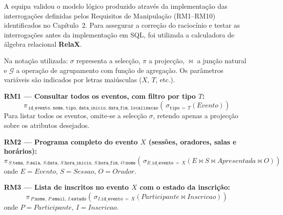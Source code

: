 \documentclass[runningheads]{llncs}
\begin{document}
                A equipa validou o modelo lógico produzido através da implementação das
                interrogações definidas pelos Requisitos de Manipulação (RM1--RM10) identificados
                no Capítulo~2. Para assegurar a correção do raciocínio e testar as interrogações
                antes da implementação em SQL, foi utilizada a calculadora de álgebra relacional
                \textbf{RelaX}.

                \vspace{0.3cm}
                Na notação utilizada: $\sigma$ representa a selecção, $\pi$ a projecção,
                $\bowtie$ a junção natural e $\mathcal{G}$ a operação de agrupamento com função
                de agregação. Os parâmetros variáveis são indicados por letras maiúsculas
                ($X$, $T$, etc.).

                \vspace{0.4cm}
                \noindent\textbf{RM1 — Consultar todos os eventos, com filtro por tipo $T$:}
                \[
                \pi_{\,\texttt{id\_evento},\,\texttt{nome},\,\texttt{tipo},\,\texttt{data\_inicio},\,\texttt{data\_fim},\,\texttt{localizacao}}\!\left(\,\sigma_{\texttt{tipo}\,=\,T}\!\left(\mathit{Evento}\right)\right)
                \]
                Para listar todos os eventos, omite-se a selecção $\sigma$, retendo apenas a
                projecção sobre os atributos desejados.

                \vspace{0.4cm}
                \noindent\textbf{RM2 — Programa completo do evento $X$ (sessões, oradores, salas e horários):}
                \[
                \pi_{\,S.\texttt{tema},\,S.\texttt{sala},\,S.\texttt{data},\,S.\texttt{hora\_inicio},\,S.\texttt{hora\_fim},\,O.\texttt{nome}}\!\left(\,\sigma_{E.\texttt{id\_evento}\,=\,X}\!\left(E \bowtie S \bowtie \mathit{Apresentada} \bowtie O\right)\right)
                \]
                onde $E = \mathit{Evento}$, $S = \mathit{Sessao}$, $O = \mathit{Orador}$.

                \vspace{0.4cm}
                \noindent\textbf{RM3 — Lista de inscritos no evento $X$ com o estado da inscrição:}
                \[
                \pi_{\,P.\texttt{nome},\,P.\texttt{email},\,I.\texttt{estado}}\!\left(\,\sigma_{I.\texttt{id\_evento}\,=\,X}\!\left(\mathit{Participante} \bowtie \mathit{Inscricao}\right)\right)
                \]
                onde $P = \mathit{Participante}$, $I = \mathit{Inscricao}$.
\end{document}
